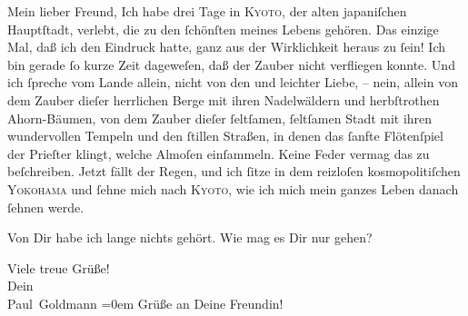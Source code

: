 \pstart\center{}Mein lieber Freund,\pend\vspace{0.5em}
\pstart
           Ich habe drei Tage in \textsc{Kyoto}, der alten japaniſchen Hauptſtadt, verlebt, die zu den{ }ſchönſten
               meines Lebens gehören. Das einzige Mal, daß ich den Eindruck hatte, ganz aus der
               Wirklichkeit heraus zu{ }ſein! Ich bin gerade{ }ſo kurze Zeit dageweſen, daß der Zauber
               nicht verfliegen konnte. Und ich{ }ſpreche vom Lande allein,  nicht von den \label{K_L02864-1v}\label{K_L02864-1} und leichter Liebe, – nein, allein von dem Zauber dieſer
               herrlichen Berge mit ihren Nadelwäldern und herbſtrothen Ahorn-Bäumen, von dem {\pb}Zauber dieſer{ }ſeltſamen,{ }ſeltſamen Stadt mit ihren wundervollen  Tempeln und den{ }ſtillen Straßen, in denen
               das{ }ſanfte Flötenſpiel der Prieſter klingt, welche Almoſen einſammeln. Keine Feder
               vermag das zu beſchreiben. Jetzt fällt der Regen, und ich{ }ſitze in dem reizloſen
               kosmopolitiſchen \textsc{Yokohama} und{ }ſehne mich nach \textsc{Kyoto}, wie ich mich mein ganzes Leben danach{ }ſehnen werde.\pend
           
\pstart
           Von Dir habe ich lange nichts gehört. Wie mag es Dir nur gehen?\pend
           
\pstart
           Viele treue Grüße! {\\[\baselineskip]}Dein {\\[\baselineskip]}\spacefill\mbox{Paul Goldmann}\pend
           \leftskip=0em{}
\pstart
           \noindent{}Grüße an Deine Freundin!\pend
           \endnumbering{}  \newcommand{\dateiname}{L02864}\newcommand{\titel}{Paul Goldmann an Arthur Schnitzler, 3. 11. [1898]}\newcommand{\editorInnen}{Martin Anton Müller und Laura Untner}
